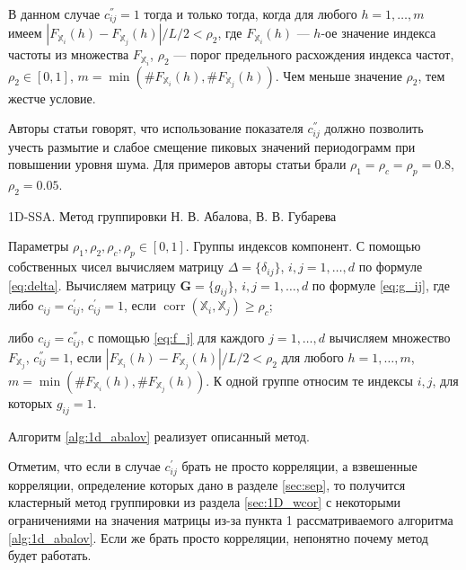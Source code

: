 \documentclass[specialist,
               substylefile = spbu.rtx,
               subf,href,colorlinks=true, 12pt]{disser}
\def\corr{\mathop{\mathrm{corr}}}
\begin{document}
В данном случае $c^{''}_{ij}=1$ тогда и только тогда, когда для любого $h=1,\ldots,m$ имеем $|F_{\mathbb{X}_i}(h) - F_{\mathbb{X}_j}(h)|/ L/2 < \rho_2$, где $F_{\mathbb{X}_i}(h)$ --- $h$-ое значение индекса частоты из множества $F_{\mathbb{X}_i}$, $\rho_2$ --- порог предельного расхождения индекса частот,  $\rho_2 \in [0,1]$, $m = \min\left(\#F_{\mathbb{X}_i}(h), \#F_{\mathbb{X}_j}(h) \right)$. Чем меньше значение $\rho_2$, тем жестче условие.

Авторы статьи говорят, что использование показателя $c^{''}_{ij}$ должно позволить
учесть размытие и слабое смещение пиковых значений периодограмм при повышении уровня шума.
Для примеров авторы статьи брали $\rho_1 =\rho_c =\rho_p = 0.8$, $\rho_2 = 0.05$.

\begin{algorithm}[!hhh]
\caption{1D-SSA. Метод группировки Н. В. Абалова, В. В. Губарева}
\label{alg:1d_abalov}
\begin{algorithmic}[1]
\REQUIRE Параметры $\rho_1, \rho_2, \rho_c, \rho_p  \in [0,1]$.
\ENSURE Группы индексов компонент.
\STATE  С помощью собственных чисел вычисляем матрицу $\Delta = \{\delta_{ij}\}$, $i,j=1,\ldots,d$ по формуле \eqref{eq:delta}. 
\STATE Вычисляем матрицу $\mathbf{G}=\{g_{ij}\}$, $i,j = 1,\ldots,d$ по формуле \eqref{eq:g_ij}, где\\
либо $c_{ij} = c_{ij}^{'}$, $c_{ij}^{'} = 1$, если  $\corr(\mathbb{X}_i, \mathbb{X}_j) \geqslant \rho_c$;

либо $c_{ij} = c_{ij}^{''}$, с помощью \eqref{eq:f_j} для каждого $j = 1,\ldots, d$ вычисляем множество $F_{\mathbb{X}_j}$, $c_{ij}^{''} = 1$, если $|F_{\mathbb{X}_i}(h) - F_{\mathbb{X}_j}(h)|/ L/2 < \rho_2$ для любого $h=1,\ldots,m$, $m = \min\left(\#F_{\mathbb{X}_i}(h), \#F_{\mathbb{X}_j}(h) \right)$.
\STATE К одной группе относим те индексы $i,j$, для которых $g_{ij} = 1$. 
\end{algorithmic}
\end{algorithm}

Алгоритм \ref{alg:1d_abalov} реализует описанный метод. 

Отметим, что если в случае $c_{ij}^{'}$ брать не просто корреляции, а взвешенные корреляции, определение которых дано в разделе \ref{sec:sep}, то получится кластерный метод группировки из раздела \ref{sec:1D_wcor} с некоторыми ограничениями на значения матрицы из-за пункта 1 рассматриваемого алгоритма \ref{alg:1d_abalov}. Если же брать просто корреляции, непонятно почему метод будет работать.
\end{document}
